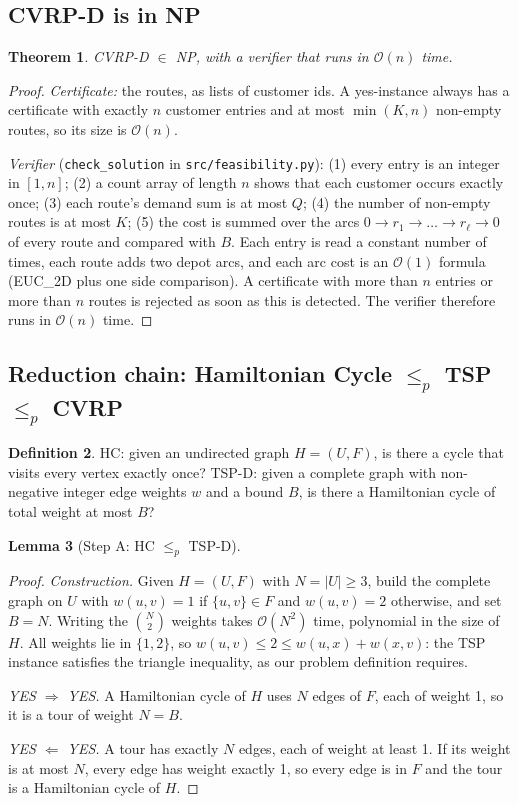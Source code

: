 \documentclass[11pt,a4paper]{article}
\newtheorem{theorem}{Theorem}
\newtheorem{lemma}[theorem]{Lemma}
\theoremstyle{definition}
\newtheorem{definition}[theorem]{Definition}
\theoremstyle{remark}
\newcommand{\code}[1]{\texttt{#1}}
\newcommand{\Ocal}{\mathcal{O}}
\begin{document}
\subsection{CVRP-D is in NP}
\begin{theorem}\label{thm:np}
CVRP-D $\in$ NP, with a verifier that runs in $\Ocal(n)$ time.
\end{theorem}
\begin{proof}
\emph{Certificate:} the routes, as lists of customer ids. A yes-instance always has a
certificate with exactly $n$ customer entries and at most $\min(K,n)$ non-empty routes,
so its size is $\Ocal(n)$.

\emph{Verifier} (\code{check\_solution} in \code{src/feasibility.py}): (1) every entry is an
integer in $[1,n]$; (2) a count array of length $n$ shows that each customer occurs exactly
once; (3) each route's demand sum is at most $Q$; (4) the number of non-empty routes is at
most $K$; (5) the cost is summed over the arcs $0\to r_1\to\dots\to r_\ell\to 0$ of every
route and compared with $B$. Each entry is read a constant number of times, each route adds
two depot arcs, and each arc cost is an $\Ocal(1)$ formula (EUC\_2D plus one side
comparison). A certificate with more than $n$ entries or more than $n$ routes is rejected as
soon as this is detected. The verifier therefore runs in $\Ocal(n)$ time.
\end{proof}

\subsection{Reduction chain: Hamiltonian Cycle $\le_p$ TSP $\le_p$ CVRP}
\begin{definition}
HC: given an undirected graph $H=(U,F)$, is there a cycle that visits every vertex exactly
once? TSP-D: given a complete graph with non-negative integer edge weights $w$ and a bound
$B$, is there a Hamiltonian cycle of total weight at most $B$?
\end{definition}

\begin{lemma}[Step A: HC $\le_p$ TSP-D]\label{lem:hc}
\end{lemma}
\begin{proof}
\emph{Construction.} Given $H=(U,F)$ with $N=|U|\ge 3$, build the complete graph on $U$
with $w(u,v)=1$ if $\{u,v\}\in F$ and $w(u,v)=2$ otherwise, and set $B=N$. Writing the
$\binom{N}{2}$ weights takes $\Ocal(N^2)$ time, polynomial in the size of $H$. All weights
lie in $\{1,2\}$, so $w(u,v)\le 2\le w(u,x)+w(x,v)$: the TSP instance satisfies the
triangle inequality, as our problem definition requires.

\emph{YES $\Rightarrow$ YES.} A Hamiltonian cycle of $H$ uses $N$ edges of $F$, each of
weight 1, so it is a tour of weight $N=B$.

\emph{YES $\Leftarrow$ YES.} A tour has exactly $N$ edges, each of weight at least 1. If its
weight is at most $N$, every edge has weight exactly 1, so every edge is in $F$ and the
tour is a Hamiltonian cycle of $H$.
\end{proof}
\end{document}
